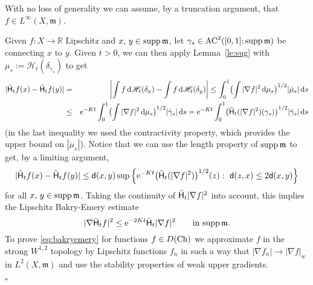 \documentclass[reqno,11pt]{article}
\numberwithin{equation}{section}
\newcommand{\C}{\mathbb{C}}
\newcommand{\R}{\mathbb{R}}
\newcommand{\mm}{{\mbox{\boldmath$m$}}}
\newcommand{\sfd}{{\sf d}}
\newcommand{\rme}{{\mathrm e}}
\newcommand{\supp}{\mathop{\rm supp}\nolimits}   %
\renewcommand{\d}{{\mathrm d}}
\newenvironment{proof}{\removelastskip\par\medskip   %
\noindent{\em Proof.}
\rm}{\penalty-20\null\hfill$\square$\par\medbreak}
\newcommand{\weakgrad}[1]{|\nabla #1|_w}                %
\renewcommand{\C}{{\rm Ch}}
\newcommand{\heatl}{{\sf H}}
\newcommand{\heatw}{{\mathscr H}}
\newcommand{\ke}[2]{\heatw_{#2}(\delta_{#1})}
\newcommand{\AC}[3]{\mathrm{AC}^{#1}(#2;#3)}
\renewcommand{\mm}{\mathfrak m}
\begin{document}
\begin{proof} With no loss of generality we can assume, by a truncation argument,
that $f\in L^\infty(X,\mm)$.

Given $f:X\to\R$ Lipschitz and $x,\,y\in \supp\mm$, let $\gamma_s\in
\AC2{[0,1]}{\supp\mm}$ be connecting $x$ to $y$. Given $t>0$, we can
then apply Lemma~\ref{le:sug} with $\mu_s:=\ke {\gamma_s}t$ to get
\begin{eqnarray}\label{eq:intermediate}
|\tilde\heatl_t f(x)-\tilde\heatl_t f(y)|&=&\biggl|\int f\,\d\ke
xt-\int f\,\d\ke yt\biggr|\leq\int_0^1\bigl(\int |\nabla
f|^2\,\d\mu_s\bigr)^{1/2} |\dot\mu_s|\,\d s\\&\leq&
\rme^{-Kt}\int_0^1\bigl(\int |\nabla
f|^2\,\d\mu_s\bigr)^{1/2}|\dot\gamma_s|\,\d s
=\rme^{-Kt}\int_0^1\bigl(\tilde\heatl_t( |\nabla
f|^2)(\gamma_s)\bigr)^{1/2}|\dot\gamma_s|\,\d s\nonumber
\end{eqnarray}
(in the last inequality we used the contractivity property, which
provides the upper bound on $|\dot\mu_s|$). Notice that we can use
the length property of $\supp\mm$ to get, by a limiting argument,
\begin{equation}\label{eq:Alica2}
|\tilde\heatl_tf(x)-\tilde\heatl_t f(y)|\leq \sfd(x,y)\sup\left\{
\rme^{-Kt}\big(\tilde\heatl_t(|\nabla f|^2)\big)^{1/2}(z):\
\sfd(z,x)\leq 2\sfd(x,y)\right\}
\end{equation}
for all $x,\,y\in\supp\mm$. Taking the continuity of
$\tilde\heatl_t|\nabla f|^2$ into account, this implies the
Lipschitz Bakry-Emery estimate
$$
|\nabla\tilde\heatl_t f|^2\leq\rme^{-2Kt}\tilde\heatl_t|\nabla f|^2
\qquad\text{in $\supp\mm$.}
$$
To prove \eqref{eq:bakryemery} for functions $f\in D(\C)$ we
approximate $f$ in the strong $W^{1,2}$ topology by Lipschitz
functions $f_n$ in such a way that $|\nabla f_n|\to\weakgrad{f}$ in
$L^2(X,\mm)$ and use the stability properties of weak upper
gradients.


\end{proof}
\end{document}

